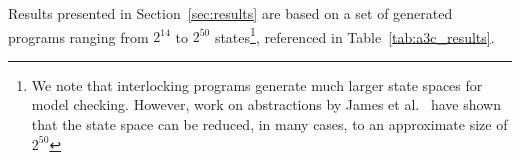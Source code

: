 \documentclass[runningheads]{llncs}
\begin{document}

Results presented in Section~\ref{sec:results} are based on a set of generated programs ranging from $2^{14}$ to $2^{50}$ states\footnote{We note that interlocking programs generate much larger state spaces for model checking. However, work on abstractions by James et al.~\cite{james2011automatically} have shown that the state space can be reduced, in many cases, to an approximate size of $2^{50}$}, referenced in Table~\ref{tab:a3c_results}.
\end{document}
